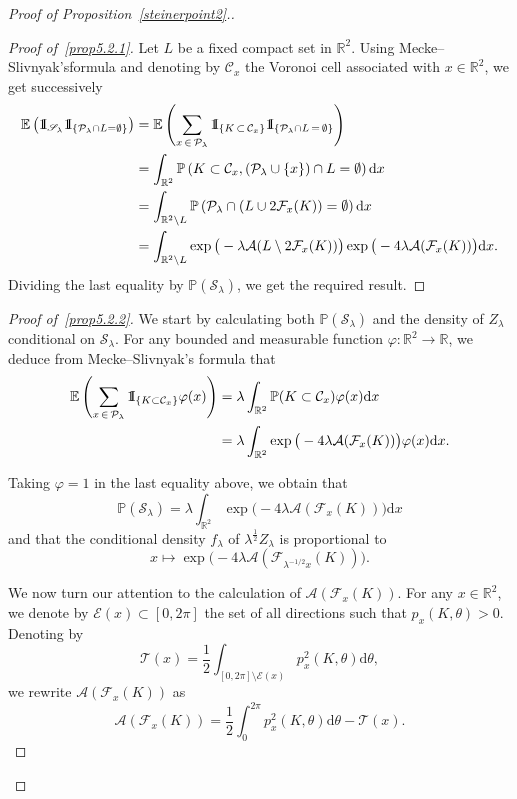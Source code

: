 \documentclass[10pt]{amsart}
\theoremstyle{definition}\newtheorem{defi}[theo]{Definition}\newtheorem{rema}[theo]{Remark}\newtheorem{exam}[theo]{Example}\newtheorem{exem}[theo]{Example}\newtheorem{nota}[theo]{Notation}
\newcommand{\indic}{1\negthickspace\text{I}}
\newcommand{\cA}{\mathcal{A}}
\newcommand{\cC}{\mathcal{C}}
\newcommand{\cE}{\mathcal{E}}
\newcommand{\cF}{\mathcal{F}}
\newcommand{\cP}{\mathcal{P}}
\newcommand{\scS}{\mathscr{S}}
\newcommand{\cT}{\mathcal{T}}
\newcommand{\dd}{\mathrm{d}}
\newcommand{\E}{\mathbb{E}}
\renewcommand{\P}{\mathbb{P}}
\newcommand{\R}{\mathbb{R}}
\newcommand{\pass}{\vspace{0.3cm}\noindent}
\newenvironment*{prooff}{\begin{proof}}{\let\qed\relax\end{proof}}
\newenvironment*{lastprooff}{\begin{proof}}{\end{proof}}
\begin{document}
\begin{proof}[{Proof of Proposition~\ref{steinerpoint2}.}]

\begin{prooff}[{Proof of~\eqref{prop5.2.1}}]
Let $L$ be a fixed compact set in $\R^2$. Using Mecke--Slivnyak's\linebreak formula and denoting by $\cC_x$ the Voronoi cell associated with $x\in\R^2$, we get successively
\begin{align*}
\E\left(\indic_{\scS_{\lambda}}\indic_{\left\{\cP_{\lambda}\cap L=\emptyset\right\}}\right) & = \E\left(\sum_{x\,\in\,\cP_{\lambda}}\indic_{\left\{K\,\subset\,\cC_x\right\}}\indic_{\{\cP_{\lambda}\cap L\,=\,\emptyset\}}\right)\\
& =\int_{\R^2} \P\left(K\subset \cC_x,(\cP_{\lambda}\cup\{x\})\cap L=\emptyset\right)\dd x\\
& =\int_{\R^2\setminus L}\P\left(\cP_{\lambda}\cap (L\cup 2\cF_x(K))=\emptyset\right)\dd x\\
& =\int_{\R^2\setminus L}\exp\big(-\lambda\cA(L\setminus 2\cF_x(K))\big)\exp\big(-4\lambda\cA(\cF_x(K))\big)\dd x.
\end{align*}
Dividing the last equality by $\P(\scS_{\lambda})$, we get the required result.
\end{prooff}

\begin{lastprooff}[{Proof of~\eqref{prop5.2.2}}]
We start by calculating both $\P(\scS_{\lambda})$ and the density of $Z_{\lambda}$ conditional on $\scS_{\lambda}$. For any bounded and measurable function $\varphi:\R^2\longrightarrow \R$, we deduce from Mecke--Slivnyak's formula that
\begin{align*}
\E\left(\sum_{x\,\in\,\cP_{\lambda}}\indic_{\left\{K\subset \cC_x\right\}}\varphi(x)\right) &=\lambda\int_{\R^2} \P(K \subset \cC_x) \varphi(x) \dd x\\
 &=\lambda\int_{\R^2} \exp\big(-4\lambda\cA(\cF_x(K))\big) \varphi(x) \dd x.
\end{align*}

Taking $\varphi=1$ in the last equality above, we obtain that
\begin{equation*}
\P(\scS_{\lambda})=\lambda\int_{\R^2}\exp\big(-4\lambda\cA(\cF_x(K))\big)\dd x
\end{equation*}
and that the conditional density $f_{{\lambda}}$
of $\lambda^{\frac12}Z_{\lambda}$ is proportional to
\[
x\longmapsto\exp\big(-4\lambda\cA(\cF_{\lambda^{-1/2}x}(K))\big).
\]

We now turn our attention to the calculation of $\cA(\cF_x(K))$. For any $x\in \R^2$, we denote by $\cE(x)\subset [0,2\pi]$ the set of all directions such that $p_x(K,\theta)> 0$. Denoting by
\begin{equation*}\label{eq:resteairefleur}
{\cT}(x)=\frac1{2}\int_{[0,2\pi]\setminus\cE(x)}p_x^2(K,\theta)\dd \theta,
\end{equation*}
we rewrite $\cA(\cF_x(K))$ as
\begin{equation*}
\cA(\cF_x(K)) =\frac1{2}\int_0^{2\pi}p_x^2(K,\theta)\dd\theta-{\cT}(x).
\end{equation*}


\end{lastprooff}
\end{proof}
\end{document}
